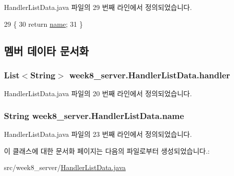 Handler\-List\-Data.\-java 파일의 29 번째 라인에서 정의되었습니다.


\begin{DoxyCode}
29                             \{
30         \textcolor{keywordflow}{return} \hyperlink{classweek8__server_1_1_handler_list_data_a6b207124eddb629f42eb688e7e107df1}{name};
31     \}
\end{DoxyCode}


\subsection{멤버 데이타 문서화}
\hypertarget{classweek8__server_1_1_handler_list_data_a6905ecd2a867500c1096d5543b36bb91}{
\subsubsection[{handler}]{\setlength{\rightskip}{0pt plus 5cm}List$<$String$>$ week8\-\_\-server.\-Handler\-List\-Data.\-handler\hspace{0.3cm}{\ttfamily [private]}}}\label{classweek8__server_1_1_handler_list_data_a6905ecd2a867500c1096d5543b36bb91}


Handler\-List\-Data.\-java 파일의 20 번째 라인에서 정의되었습니다.

\hypertarget{classweek8__server_1_1_handler_list_data_a6b207124eddb629f42eb688e7e107df1}{
\subsubsection[{name}]{\setlength{\rightskip}{0pt plus 5cm}String week8\-\_\-server.\-Handler\-List\-Data.\-name\hspace{0.3cm}{\ttfamily [private]}}}\label{classweek8__server_1_1_handler_list_data_a6b207124eddb629f42eb688e7e107df1}


Handler\-List\-Data.\-java 파일의 23 번째 라인에서 정의되었습니다.



이 클래스에 대한 문서화 페이지는 다음의 파일로부터 생성되었습니다.\-:\begin{DoxyCompactItemize}
\item 
src/week8\-\_\-server/\hyperlink{_handler_list_data_8java}{Handler\-List\-Data.\-java}\end{DoxyCompactItemize}
